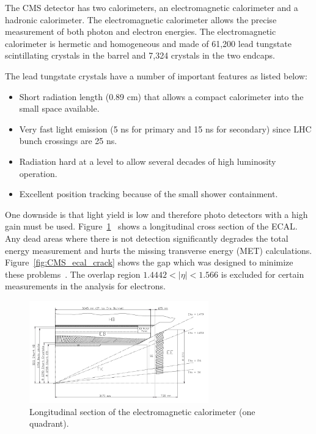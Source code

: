 The CMS detector has two calorimeters, an electromagnetic calorimeter and a hadronic calorimeter. The electromagnetic calorimeter allows the precise measurement of both photon and electron energies.  The electromagnetic calorimeter is hermetic and homogeneous and made of 61,200 lead tungstate scintillating crystals in the barrel and 7,324 crystals in the two endcaps.~\cite{ECAL_report}

The lead tungstate crystals have a number of important features as listed below:
\begin{itemize}
  \item
    Short radiation length (0.89 cm) that allows a compact calorimeter into the small space available.
  \item
    Very fast light emission (5 ns for primary and 15 ns for secondary) since LHC bunch crossings are 25 ns.
    \item
      Radiation hard at a level to allow several decades of high luminosity operation.
    \item
      Excellent position tracking because of the small shower containment. 
\end{itemize}

One downside is that light yield is low and therefore photo detectors with a high gain must be used.  Figure~\ref{fig:CMS_ecal_quadrant}~\cite{ECAL_report} shows a longitudinal cross section of the ECAL. Any dead areas where there is not detection significantly degrades the total energy measurement and hurts the missing transverse energy (MET) calculations. Figure~\ref{fig:CMS_ecal_crack} shows the gap which was designed to minimize these problems~\cite{ECAL_report}. The overlap region $1.4442 < |\eta| < 1.566$ is excluded for certain measurements in the analysis for electrons.

\begin{figure}[htb]
\centering
\includegraphics[width=0.69\textwidth]{Experiment/ECAL_quadrant.pdf}
\caption{Longitudinal section of the electromagnetic calorimeter (one quadrant).~\cite{ECAL_report}}
\label{fig:CMS_ecal_quadrant}
\end{figure}

